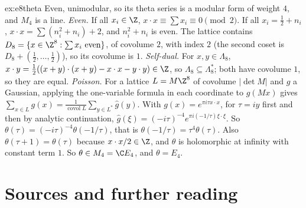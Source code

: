 \begin{solution}{ex:e8theta}
\idea Even, unimodular, so its theta series is a modular form of weight $4$, and $M_4$ is a line.
\writeup \emph{Even.} If all $x_i\in\Z$, $x\cdot x\equiv\sum x_i\equiv0\pmod2$. If all $x_i=\frac12+n_i$, $x\cdot x=\sum(n_i^2+n_i)+2$, and $n_i^2+n_i$ is even. The lattice
contains $D_8=\{x\in\Z^8:\sum x_i\text{ even}\}$, of covolume $2$, with index $2$ (the second coset is $D_8+(\frac12,\dots,\frac12)$), so its covolume is $1$.
\emph{Self-dual.} For $x,y\in\Lambda_8$, $x\cdot y=\frac12((x+y)\cdot(x+y)-x\cdot x-y\cdot y)\in\Z$, so $\Lambda_8\subseteq\Lambda_8^*$; both have covolume $1$, so they are equal.
\emph{Poisson.} For a lattice $L=M\Z^8$ of covolume $|\det M|$ and $g$ a Gaussian, applying the one-variable formula in each coordinate to $g(Mx)$ gives
$\sum_{x\in L}g(x)=\frac1{\operatorname{covol}L}\sum_{y\in L^*}\hat g(y)$. With $g(x)=e^{\pi i\tau x\cdot x}$, for $\tau=iy$ first and then by analytic continuation,
$\hat g(\xi)=(-i\tau)^{-4}e^{\pi i(-1/\tau)\xi\cdot\xi}$. So $\theta(\tau)=(-i\tau)^{-4}\theta(-1/\tau)$, that is $\theta(-1/\tau)=\tau^4\theta(\tau)$. Also $\theta(\tau+1)=\theta(\tau)$
because $x\cdot x/2\in\Z$, and $\theta$ is holomorphic at infinity with constant term $1$. So $\theta\in M_4=\C E_4$, and $\theta=E_4$.
\end{solution}

\section*{Sources and further reading}

